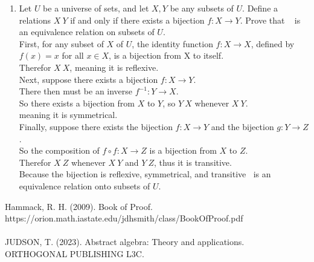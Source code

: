 \documentclass[sigconf]{article}
\begin{document}
\begin{enumerate}
  \item Let $U$ be a universe of sets, and let $X,Y$ be any subsets of $U$. Define a relations $X~Y$ if and only if there exists a bijection $f:X\rightarrow Y$. Prove that ~ is an equivalence relation on subsets of $U$. \\
        First, for any subset of $X$ of $U$, the identity function $f:X\rightarrow X$, defined by $f(x)=x$ for all $x\in X$, is a bijection from X to itself.\\
        Therefor $X~X$, meaning it is reflexive.\\
        Next, suppose there exists a bijection $f:X\rightarrow Y$.\\
        There then must be an inverse $f^{-1}:Y\rightarrow X$.\\
        So there exists a bijection from $X$ to $Y$, so $Y~X$ whenever $X~Y$.\\
        meaning it is symmetrical.\\
        Finally, suppose there exists the bijection $f:X\rightarrow Y$ and the bijection $g:Y\rightarrow Z$.\\
        So the composition of $f\circ f:X\rightarrow Z$ is a bijection from $X$ to $Z$.\\
        Therefor $X~Z$ whenever $X~Y$ and $Y~Z$, thus it is transitive.\\
        Because the bijection is reflexive, symmetrical, and transitive $~$ is an equivalence relation onto subsets of $U$.
\end{enumerate}


Hammack, R. H. (2009). Book of Proof.\\ https://orion.math.iastate.edu/jdhsmith/class/BookOfProof.pdf
\\
\\
JUDSON, T. (2023). Abstract algebra: Theory and applications. ORTHOGONAL PUBLISHING L3C. 


\end{document}
